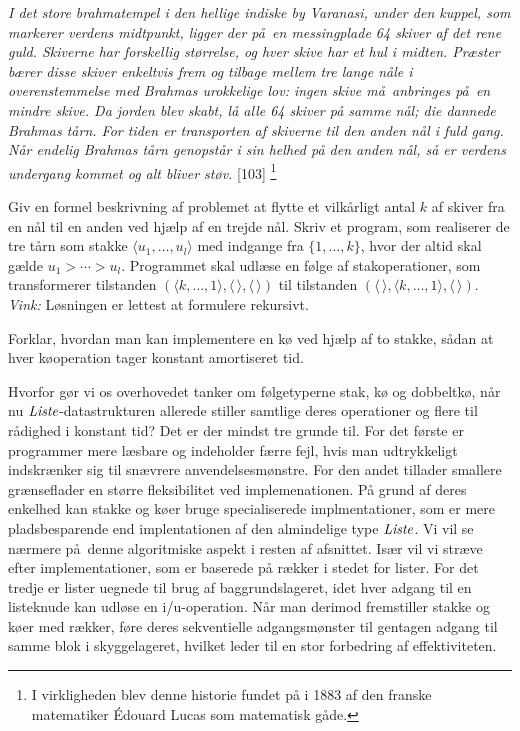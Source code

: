 \begin{exerc}
 \emph{
  I det store brahmatempel i den hellige indiske by Varanasi, under den kuppel, som markerer verdens midtpunkt, ligger der på en messingplade 64 skiver af det rene guld.
   Skiverne har forskellig størrelse, og hver skive har et hul i midten.
   Præster bærer disse skiver enkeltvis frem og tilbage mellem tre lange nåle i overenstemmelse med Brahmas urokkelige lov: ingen skive må anbringes på en mindre skive.
   Da jorden blev skabt, lå alle 64 skiver på samme nål; die dannede Brahmas tårn.
   For tiden er transporten af skiverne til den anden nål i fuld gang.
   Når endelig Brahmas tårn genopstår i sin helhed på den anden nål, så er verdens undergang kommet og alt bliver støv.} [103] 
   \footnote{I virkligheden blev denne historie fundet på i 1883 af den franske matematiker Édouard Lucas som matematisk gåde.}

   Giv en formel beskrivning af problemet at flytte et vilkårligt antal $k$ af skiver fra en nål til en anden ved hjælp af en trejde nål.
   Skriv et program, som realiserer de tre tårn som stakke $\langle u_1,\ldots, u_l\rangle$ med indgange fra $\{1,\ldots,k\}$, hvor der altid skal gælde $u_1>\cdots>u_l$.
   Programmet skal udlæse en følge af stakoperationer, som transformerer tilstanden 
   $(\langle k,\ldots, 1\rangle, \langle\,\rangle, \langle\,\rangle)$
   til tilstanden
   $(\langle\,\rangle, \langle k,\ldots, 1\rangle, \langle\,\rangle)$.
   \emph{Vink:} Løsningen er lettest at formulere rekursivt.
\end{exerc}

\begin{exerc}
  Forklar, hvordan man kan implementere en kø ved hjælp af to stakke, sådan at hver køoperation tager konstant amortiseret tid.
\end{exerc}

Hvorfor gør vi os overhovedet tanker om følgetyperne stak, kø og dobbeltkø, når nu $\operatorname{\emph{Liste}}$-datastrukturen allerede stiller samtlige deres operationer og flere til rådighed i konstant tid?
Det er der mindst tre grunde til.
For det første er programmer mere læsbare og indeholder færre fejl, hvis man udtrykkeligt indskrænker sig til snævrere anvendelsesmønstre.
For den andet tillader smallere grænseflader en større fleksibilitet ved implemenationen.
På grund af deres enkelhed kan stakke og køer bruge specialiserede implmentationer, som er mere pladsbesparende end implentationen af den almindelige type $\operatorname{\emph{Liste}}$.
Vi vil se nærmere på denne algoritmiske aspekt i resten af afsnittet.
Især vil vi stræve efter implementationer, som er baserede på rækker i stedet for lister.
For det tredje er lister uegnede til brug af baggrundslageret, idet hver adgang til en listeknude kan udløse en i/u-operation.
Når man derimod fremstiller stakke og køer med rækker, føre deres sekventielle adgangsmønster til gentagen adgang til samme blok i skyggelageret, hvilket leder til en stor forbedring af effektiviteten.

